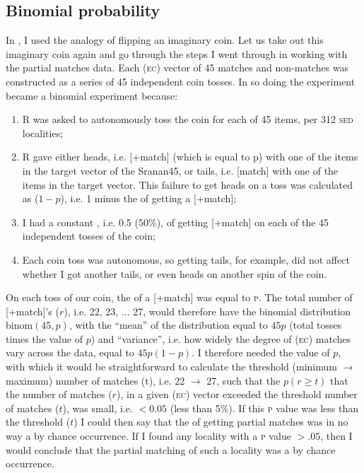 \subsection{Binomial probability}\label{4.2.2}
In , I used the analogy of flipping an imaginary coin. Let us take out this imaginary coin again and go through the steps I went through in working with the partial matches data. Each (\textsc{ec}) vector of 45 matches and non-matches was constructed as a series of 45 independent coin tosses. In so doing the experiment became a binomial experiment because:

\begin{enumerate}
\item {R was asked to autonomously toss the coin for each of 45 items, per 312 \textsc{sed} localities;}
\item{R gave either heads, i.e. [+match] (which is equal to p) with one of the items in the target vector of the Sranan45, or tails, i.e. [\textminus{}match] with one of the items in the target vector. This failure to get heads on a toss was calculated as ($1-p$), i.e. 1 minus the  of getting a [+match];}
\item{I had a constant , i.e. 0.5 (50\%), of getting [+match] on each of the 45 independent tosses of the coin;}
\item{Each coin toss was autonomous, so getting tails, for example, did not affect whether I got another tails, or even heads on another spin of the coin.}
\end{enumerate}

On each toss of our coin, the  of a [+match] was equal to \textsc{p}. The total number of [+match]'s ($r$), i.e. 22, 23, ... 27, would therefore have the binomial distribution $\text{binom}(45, p)$, with the ``mean'' of the distribution equal to $45p$ (total tosses times the value of $p$) and ``variance'', i.e. how widely the degree of (\textsc{ec}) matches vary across the data, equal to $45p(1-p)$. I therefore needed the value of $p$, with which it would be straightforward to calculate the threshold (minimum $\rightarrow$ maximum) number of matches (t), i.e. 22 $\rightarrow$ 27, such that the  $p(r \geq t)$ that the number of matches ($r$), in a given (\textsc{ec}) vector exceeded the threshold number of matches ($t$), was small, i.e. $<0.05$ (less than 5\%). If this \textsc{p} value was less than the threshold ($t$) I could then say that the  of getting partial matches was in no way a by chance occurrence. If I found any locality with a \textsc{p} value $>.05$, then I would conclude that the partial matching of such a locality was a by chance occurrence.

